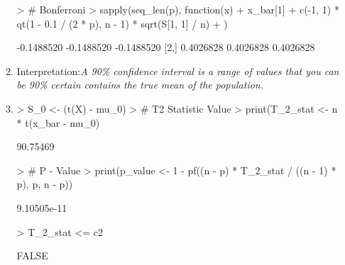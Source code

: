 \documentclass[12pt,a4paper]{paper}
\begin{document}
\begin{enumerate}
\begin{enumerate}
\begin{Schunk}
\begin{Sinput}
> # Bonferroni 
> sapply(seq_len(p), function(x){
+ x_bar[1] + c(-1, 1) * qt(1 - 0.1 / (2 * p), n - 1) * sqrt(S[1, 1] / n)
+ })
\end{Sinput}
\begin{Soutput}
           [,1]       [,2]       [,3]
[1,] -0.1488520 -0.1488520 -0.1488520
[2,]  0.4026828  0.4026828  0.4026828
\end{Soutput}
\end{Schunk}
\item Interpretation:\textit{A 90\% confidence interval is a range of values that you can be 90\% certain contains the true mean of the population.}
\item
\begin{Schunk}
\begin{Sinput}
> S_0 <- (t(X) - mu_0) %*% t(t(X) - mu_0) / (n - 1)
> # T2 Statistic Value
> print(T_2_stat <- n * t(x_bar - mu_0) %*% solve(S) %*% (x_bar - mu_0))
\end{Sinput}
\begin{Soutput}
         [,1]
[1,] 90.75469
\end{Soutput}
\begin{Sinput}
> # P - Value
> print(p_value <- 1 - pf((n - p) * T_2_stat / ((n - 1) * p), p, n - p))
\end{Sinput}
\begin{Soutput}
            [,1]
[1,] 9.10505e-11
\end{Soutput}
\begin{Sinput}
> T_2_stat <= c2
\end{Sinput}
\begin{Soutput}
      [,1]
[1,] FALSE
\end{Soutput}
\end{Schunk}
\end{enumerate}
\end{enumerate}
\end{document}
